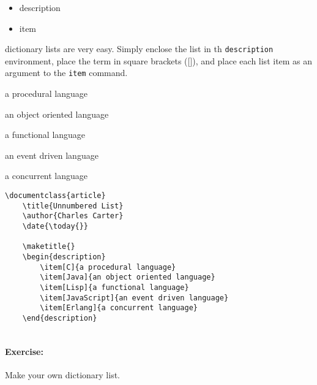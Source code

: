        \begin{framed}
            \begin{itemize}
                \item{description}
                \item{item}
            \end{itemize}
        \end{framed}

        \Lx{} dictionary lists are very easy. Simply enclose the list in th \texttt{description} environment, place the term in square brackets ([]), and place each list item as an argument to the \texttt{item} command.

    \begin{description}
    \label{lists:dictionary}
        \item[C]{a procedural language}
        \item[Java]{an object oriented language}
        \item[Lisp]{a functional language}
        \item[JavaScript]{an event driven language}
        \item[Erlang]{a concurrent language}
    \end{description}

        \begin{verbatim}
\documentclass{article}
    \title{Unnumbered List}
    \author{Charles Carter}
    \date{\today{}}
 
    \maketitle{}
    \begin{description}
        \item[C]{a procedural language}
        \item[Java]{an object oriented language}
        \item[Lisp]{a functional language}
        \item[JavaScript]{an event driven language}
        \item[Erlang]{a concurrent language}
    \end{description}
    
        \end{verbatim}

        \paragraph{Exercise:} Make your own dictionary list.

